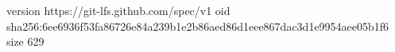 version https://git-lfs.github.com/spec/v1
oid sha256:6ee6936f53fa86726e84a239b1e2b86aed86d1eee867dac3d1e9954aee05b1f6
size 629
